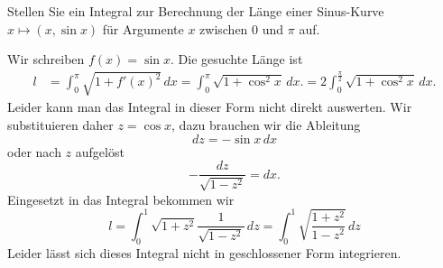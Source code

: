 Stellen Sie ein Integral zur Berechnung der Länge einer Sinus-Kurve
$x\mapsto (x,\sin x)$
für Argumente $x$ zwischen $0$ und $\pi$ auf.

\begin{loesung}
Wir schreiben $f(x)=\sin x$.
Die gesuchte Länge ist
\begin{align*}
l
&=
\int_0^\pi\sqrt{1 + f'(x)^2}\,dx
=
\int_0^\pi\sqrt{1 + \cos^2x}\,dx.
=
2
\int_0^{\frac\pi2}\sqrt{1 + \cos^2x}\,dx.
\end{align*}
Leider kann man das Integral in dieser Form nicht direkt 
auswerten.
Wir substituieren daher $z=\cos x$, dazu brauchen wir die
Ableitung
\[
dz=-\sin x\,dx
\]
oder nach $z$ aufgelöst
\[
-\frac{dz}{\sqrt{1-z^2}}=dx.
\]
Eingesetzt in das Integral bekommen wir
\[
l=
\int_0^1 \sqrt{1+z^2}\frac1{\sqrt{1-z^2}}\,dz
=
\int_0^1 \sqrt{\frac{1+z^2}{1-z^2}}\,dz
\]
Leider lässt sich dieses Integral nicht in geschlossener Form
integrieren.
\end{loesung}

